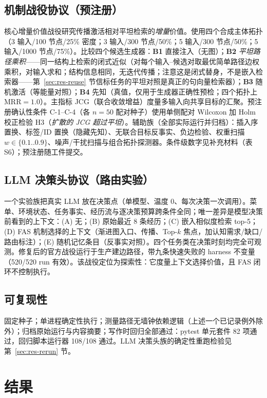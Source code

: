 \documentclass[10pt,a4paper]{ctexart}
\begin{document}
\subsection{机制战役协议（预注册）}
\label{sec:method-civ}
核心增量价值战役研究传播激活相对平坦检索的\emph{增量}价值。使用四个合成主体拓扑（3 输入/100 节点/25\% 密度；3 输入/300 节点/50\%；5 输入/300 节点/50\%；5 输入/1000 节点/75\%）。比较四个候选生成器：\textbf{B1} 直接注入（无图）；\textbf{B2} \emph{平坦路径乘积}——同一结构上检索的闭式近似（对每个输入--候选对取最优简单路径边权乘积，对输入求和；结构信息相同，无迭代传播；注意这是闭式替身，不是嵌入检索器——第~\ref{sec:res-reuse} 节信标任务的平坦对照是真正的句向量检索器）；\textbf{B3} 随机激活（等能量对照）；\textbf{B4} 先知（真值，仅用于生成器正确性预检；四个拓扑上 MRR${=}1.0$）。主指标 JCG（联合收敛增益）度量多输入向共享目标的汇聚。预注册确认性条件 C-1--C-4（各 $n{=}50$ 配对种子）使用单侧配对 Wilcoxon 加 Holm 校正检验 H3（\emph{扩散的 JCG 超过平坦}）。辅助族（全部实际运行并归档）：插入序置换、标签/ID 置换（隐藏先知）、无联合目标反事实、负边检验、权重扫描 $w\in\{0.1..0.9\}$、噪声/干扰扫描与组合拓扑探测器。条件级数字见补充材料（表 S6）；预注册随工件提交。

\subsection{LLM 决策头协议（路由实验）}
\label{sec:method-routing}
一个实验族把真实 LLM 放在决策点（单模型、温度 0、每次决策一次调用）。菜单、环境状态、任务事实、经历流与逐决策预算跨条件全同；唯一差异是模型决策前看到的上下文：(A) 无；(B) 原始最近 8 条经历；(C) 嵌入相似度检索 top-5；(D) FAS 机制选择的上下文（渐进图入口、传播、Top-$k$ 焦点，加认知需求/缺口/路由标注）；(E) 随机记忆条目（反事实对照）。四个任务类在决策时刻均完全可观测。修复后的官方战役运行于生产建边路径，带九条快速失败的 harness 不变量（520/520 run 有效）。该战役定位为探索性：它度量上下文选择价值，且 FAS 闭环不控制执行。

\subsection{可复现性}
固定种子；单进程确定性执行；测量路径无墙钟依赖逻辑（上述一个已记录例外除外）；归档原始运行与内容摘要；写作时回归全部通过：pytest 单元套件 82 项通过，回归脚本运行器 108/108 通过。LLM 决策头族的确定性重跑检验见第~\ref{sec:res-rerun} 节。

\section{结果}
\label{sec:results}
\end{document}
